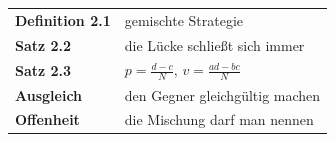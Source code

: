 \begin{merksatz}
\begin{center}
\renewcommand{\arraystretch}{1.5}
\begin{tabular}{@{}P{3.0cm}P{5.6cm}@{}}
\toprule
\textbf{Definition 2.1} & gemischte Strategie\\
\textbf{Satz 2.2} & die Lücke schließt sich immer\\
\textbf{Satz 2.3} & $p = \frac{d-c}{N}$, $v = \frac{ad-bc}{N}$\\
\textbf{Ausgleich} & den Gegner gleichgültig machen\\
\textbf{Offenheit} & die Mischung darf man nennen\\
\bottomrule
\end{tabular}
\end{center}

\begin{center}
\begin{minipage}{0.88\textwidth}
\end{minipage}
\end{center}
\end{merksatz}
